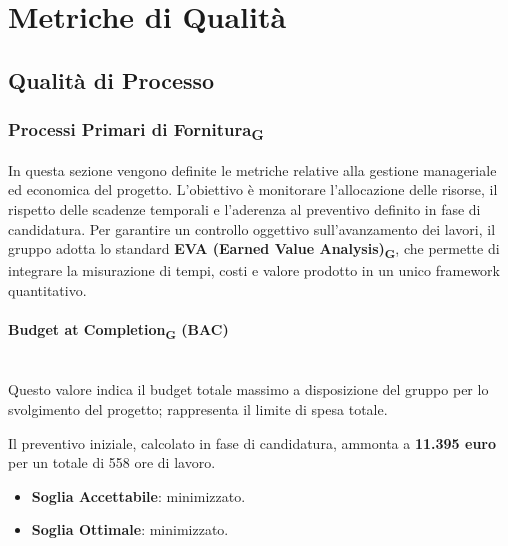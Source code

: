 \documentclass[11pt,a4paper]{article}
\newcommand{\gls}[1]{#1\textsubscript{G}}
\begin{document}
\newpage

\section{Metriche di Qualità}
\subsection{Qualità di Processo}

\subsubsection{\gls{Processi Primari di Fornitura}}
In questa sezione vengono definite le metriche relative alla gestione manageriale ed economica del progetto. L'obiettivo è monitorare l'allocazione delle risorse, il rispetto delle scadenze temporali e l'aderenza al preventivo definito in fase di candidatura.
Per garantire un controllo oggettivo sull'avanzamento dei lavori, il gruppo adotta lo standard \textbf{EVA (Earned Value Analysis)\textsubscript{G}}, che permette di integrare la misurazione di tempi, costi e valore prodotto in un unico framework quantitativo.

\paragraph{Budget at Completion\textsubscript{G} (BAC)} \hfill \\
Questo valore indica il budget totale massimo a disposizione del gruppo per lo svolgimento del progetto; rappresenta il limite di spesa totale.

Il preventivo iniziale, calcolato in fase di candidatura, ammonta a \textbf{11.395 euro} per un totale di 558 ore di lavoro.
\begin{itemize}
    \item \textbf{Soglia Accettabile}: minimizzato.
    \item \textbf{Soglia Ottimale}: minimizzato.
\end{itemize}
\end{document}
